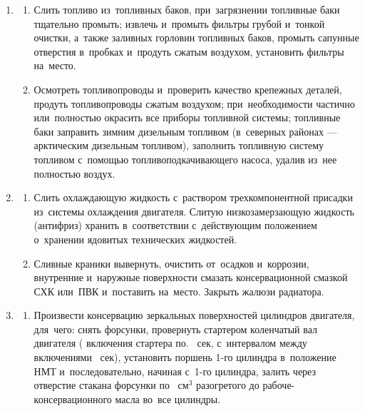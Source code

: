 \begin{enumerate}
    \item \begin{enumerate}
        \item 
        Слить топливо из~топливных баков, при~загрязнении топливные баки тщательно промыть; извлечь и~промыть фильтры грубой и~тонкой очистки, а~также заливных горловин топливных баков, промыть сапунные отверстия в~пробках и~продуть сжатым воздухом, установить фильтры на~место. 
        \item 
        Осмотреть топливопроводы и~проверить качество крепежных деталей, продуть топливопроводы сжатым воздухом; при~необходимости частично или~полностью окрасить все приборы топливной системы; топливные баки заправить зимним дизельным топливом (в~северных районах --- арктическим дизельным топливом), заполнить топливную систему топливом с~помощью топливоподкачивающего насоса, удалив из~нее полностью воздух. 
    \end{enumerate}

    \item \begin{enumerate}
        \item 
        Слить охлаждающую жидкость с~раствором трехкомпонентной присадки из~системы охлаждения двигателя. Слитую низкозамерзающую жидкость (антифриз) хранить в~соответствии с~действующим положением о~хранении ядовитых технических жидкостей. 
        \item 
        Сливные краники вывернуть, очистить от~осадков и~коррозии, внутренние и~наружные поверхности смазать консервационной смазкой СХК или~ПВК и~поставить на~место. Закрыть жалюзи радиатора. 
    \end{enumerate}

    \item \begin{enumerate}
        \item 
        Произвести консервацию зеркальных поверхностей цилиндров двигателя, для~чего: снять форсунки, провернуть стартером коленчатый вал двигателя ( включения стартера по. ~сек, с~интервалом между включениями ~сек), установить поршень 1-го цилиндра в~положение НМТ и~последовательно, начиная с~1-го цилиндра, залить через отверстие стакана форсунки по ~см$^3$ разогретого до \celc{} рабоче-консервационного масла во~все цилиндры. 
        


\end{enumerate}
\end{enumerate}
